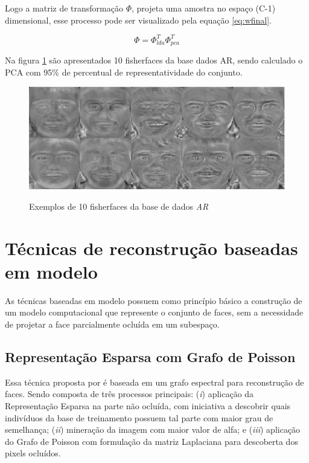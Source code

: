 Logo a matriz de transformação $\Phi$, projeta uma amostra no espaço (C-1) dimensional, esse processo pode ser visualizado pela equação \ref{eq:wfinal}.

\begin{equation}
\Phi = \Phi_{lda}^T\Phi_{pca}^T
\label{eq:wfinal}
\end{equation}

Na figura \ref{fig:fisherfaces} são apresentados 10 fisherfaces da base dados AR, sendo calculado o PCA com 95\% de percentual de representatividade do conjunto.

\begin{figure}[H]
\centering
\caption{Exemplos de 10 fisherfaces da base de dados \textit{AR}}
\includegraphics[scale = 0.75]{imgs3/fisherfaces.png}
\label{fig:fisherfaces}
\end{figure}






\section{Técnicas de reconstrução baseadas em modelo}
As técnicas baseadas em modelo possuem como princípio básico a construção de um modelo computacional que represente o conjunto de faces, sem a necessidade de projetar a face parcialmente ocluída em um subespaço. 



\subsection{Representação Esparsa com Grafo de Poisson}
\label{sub:RS_GP}


Essa técnica proposta por  é baseada em um grafo espectral para reconstrução de faces. Sendo composta de três processos principais: (\textit{i}) aplicação da Representação Esparsa na parte não ocluída, com iniciativa a descobrir quais indivíduos da base de treinamento possuem tal parte com maior grau de semelhança; (\textit{ii}) mineração da imagem com maior valor de alfa; e (\textit{iii}) aplicação do Grafo de Poisson com formulação da matriz Laplaciana para descoberta dos pixels ocluídos.


